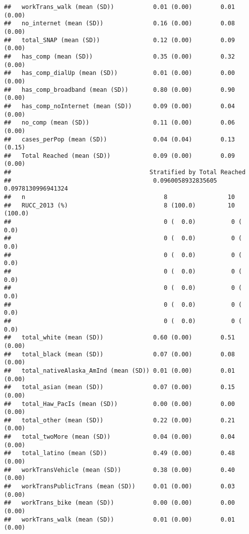 \documentclass[
]{article}
\begin{document}
\begin{verbatim}
##   workTrans_walk (mean (SD))           0.01 (0.00)        0.01 (0.00)       
##   no_internet (mean (SD))              0.16 (0.00)        0.08 (0.00)       
##   total_SNAP (mean (SD))               0.12 (0.00)        0.09 (0.00)       
##   has_comp (mean (SD))                 0.35 (0.00)        0.32 (0.00)       
##   has_comp_dialUp (mean (SD))          0.01 (0.00)        0.00 (0.00)       
##   has_comp_broadband (mean (SD))       0.80 (0.00)        0.90 (0.00)       
##   has_comp_noInternet (mean (SD))      0.09 (0.00)        0.04 (0.00)       
##   no_comp (mean (SD))                  0.11 (0.00)        0.06 (0.00)       
##   cases_perPop (mean (SD))             0.04 (0.04)        0.13 (0.15)       
##   Total Reached (mean (SD))            0.09 (0.00)        0.09 (0.00)       
##                                       Stratified by Total Reached
##                                        0.0960058932835605 0.0978130996941324
##   n                                       8                 10              
##   RUCC_2013 (%)                           8 (100.0)         10 (100.0)      
##                                           0 (  0.0)          0 (  0.0)      
##                                           0 (  0.0)          0 (  0.0)      
##                                           0 (  0.0)          0 (  0.0)      
##                                           0 (  0.0)          0 (  0.0)      
##                                           0 (  0.0)          0 (  0.0)      
##                                           0 (  0.0)          0 (  0.0)      
##                                           0 (  0.0)          0 (  0.0)      
##   total_white (mean (SD))              0.60 (0.00)        0.51 (0.00)       
##   total_black (mean (SD))              0.07 (0.00)        0.08 (0.00)       
##   total_nativeAlaska_AmInd (mean (SD)) 0.01 (0.00)        0.01 (0.00)       
##   total_asian (mean (SD))              0.07 (0.00)        0.15 (0.00)       
##   total_Haw_PacIs (mean (SD))          0.00 (0.00)        0.00 (0.00)       
##   total_other (mean (SD))              0.22 (0.00)        0.21 (0.00)       
##   total_twoMore (mean (SD))            0.04 (0.00)        0.04 (0.00)       
##   total_latino (mean (SD))             0.49 (0.00)        0.48 (0.00)       
##   workTransVehicle (mean (SD))         0.38 (0.00)        0.40 (0.00)       
##   workTransPublicTrans (mean (SD))     0.01 (0.00)        0.03 (0.00)       
##   workTrans_bike (mean (SD))           0.00 (0.00)        0.00 (0.00)       
##   workTrans_walk (mean (SD))           0.01 (0.00)        0.01 (0.00)       

\end{verbatim}
\end{document}
